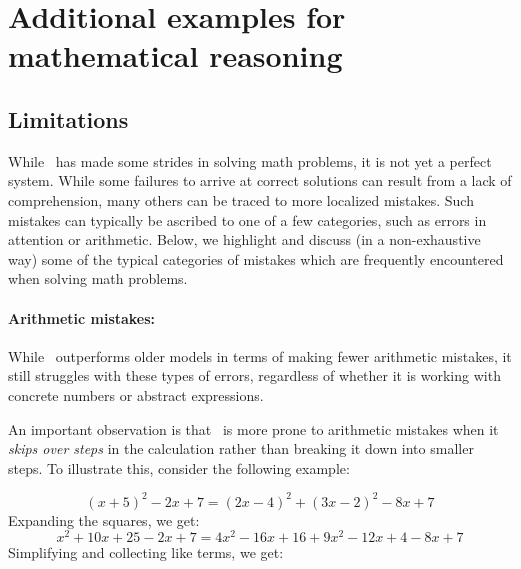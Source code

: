 \section{Additional examples for mathematical reasoning}\label{sec:math_appendix}

\subsection{Limitations}\label{sec:math-a1}

While \DV \ has made some strides in solving math problems, it is not yet a perfect system. While some failures to arrive at correct solutions can result from a lack of comprehension, many others can be traced to more localized mistakes. Such mistakes can typically be ascribed to one of a few categories, such as errors in attention or arithmetic. Below, we highlight and discuss (in a non-exhaustive way) some of the typical categories of mistakes which are frequently encountered when solving math problems.



\paragraph{Arithmetic mistakes:} While \DV \ outperforms older models in terms of making fewer arithmetic mistakes, it still struggles with these types of errors, regardless of whether it is working with concrete numbers or abstract expressions. 



An important observation is that  \DV \ is more prone to arithmetic mistakes when it \emph{skips over steps} in the calculation rather than breaking it down into smaller steps. To illustrate this, consider the following example:

\begin{AIbox}{\DV}\scriptsize
$$(x + 5)^2 - 2x + 7 = (2x - 4)^2 + (3x - 2)^2 - 8x + 7$$
Expanding the squares, we get:
$$x^2 + 10x + 25 - 2x + 7 = 4x^2 - 16x + 16 + 9x^2 - 12x + 4 - 8x + 7$$
Simplifying and collecting like terms, we get:
\end{AIbox}

